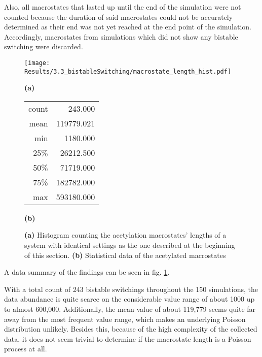             Also, all macrostates that lasted up until the end of the simulation were not counted because the duration of said macrostates could not be accurately determined as their end was not yet reached at the end point of the simulation. Accordingly, macrostates from simulations which did not show any bistable switching were discarded.

            \begin{figure}[htpb!]
                \begin{minipage}{.69\textwidth}
                    \centering
                    \texttt{[image: Results/3.3\_bistableSwitching/macrostate\_length\_hist.pdf]}
                    \caption*{\textbf{(a)}}
                \end{minipage}
                \begin{minipage}{.29\textwidth}
                    \centering
                    \begin{tabular}{rr}
                        count	& 243.000 \\
                        mean	& 119779.021 \\
                        min	    & 1180.000 \\
                        25\%	& 26212.500 \\
                        50\%	& 71719.000 \\
                        75\%	& 182782.000 \\
                        max	    & 593180.000 \\
                    \end{tabular}
                    \caption*{\textbf{(b)}}
                \end{minipage}
                \caption{\textbf{(a)} Histogram counting the acetylation macrostates' lengths of a system with identical settings as the one described at the beginning of this section. \textbf{(b)} Statistical data of the acetylated macrostates}
                \label{img:cyclBistability_hist}
            \end{figure}

            \noindent
            A data summary of the findings can be seen in fig. \ref{img:cyclBistability_hist}.

            With a total count of 243 bistable switchings throughout the 150 simulations, the data abundance is quite scarce on the considerable value range of about 1000 up to almost 600,000. Additionally, the mean value of about 119,779 seems quite far away from the most frequent value range, which makes an underlying Poisson distribution unlikely. Besides this, because of the high complexity of the collected data, it does not seem trivial to determine if the macrostate length is a Poisson process at all.

